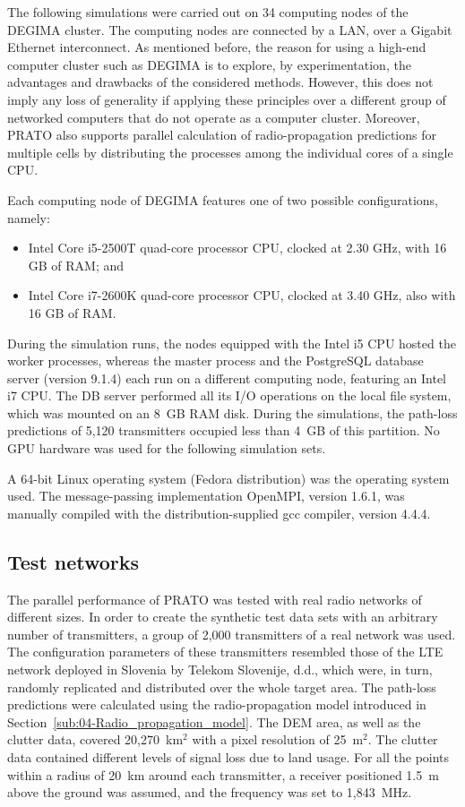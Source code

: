 The following simulations were carried out on 34 computing nodes of
the DEGIMA cluster. The computing nodes are connected by a LAN, over
a Gigabit Ethernet interconnect. As mentioned before, the reason for
using a high-end computer cluster such as DEGIMA is to explore, by
experimentation, the advantages and drawbacks of the considered methods.
However, this does not imply any loss of generality if applying these
principles over a different group of networked computers that do not
operate as a computer cluster. Moreover, PRATO also supports parallel
calculation of radio-propagation predictions for multiple cells by
distributing the processes among the individual cores of a single
CPU.

Each computing node of DEGIMA features one of two possible configurations,
namely:
\begin{itemize}
\item Intel Core i5-2500T quad-core processor CPU, clocked at 2.30 GHz,
with 16 GB of RAM; and
\item Intel Core i7-2600K quad-core processor CPU, clocked at 3.40 GHz,
also with 16 GB of RAM.
\end{itemize}
During the simulation runs, the nodes equipped with the Intel i5 CPU
hosted the worker processes, whereas the master process and the PostgreSQL
database server (version 9.1.4) each run on a different computing
node, featuring an Intel i7 CPU. The DB server performed all its I/O
operations on the local file system, which was mounted on an 8~GB
RAM disk. During the simulations, the path-loss predictions of 5,120
transmitters occupied less than 4~GB of this partition. No GPU hardware
was used for the following simulation sets.

A 64-bit Linux operating system (Fedora distribution) was the operating
system used. The message-passing implementation OpenMPI, version 1.6.1,
was manually compiled with the distribution-supplied gcc compiler,
version 4.4.4.


\subsection{Test networks}

The parallel performance of PRATO was tested with real radio networks
of different sizes. In order to create the synthetic test data sets
with an arbitrary number of transmitters, a group of 2,000 transmitters
of a real network was used. The configuration parameters of these
transmitters resembled those of the LTE network deployed in Slovenia
by Telekom Slovenije, d.d., which were, in turn, randomly replicated
and distributed over the whole target area. The path-loss predictions
were calculated using the radio-propagation model introduced in Section~\ref{sub:04-Radio_propagation_model}.
The DEM area, as well as the clutter data, covered 20,270~km$^{2}$
with a pixel resolution of 25~m$^{2}$. The clutter data contained
different levels of signal loss due to land usage. For all the points
within a radius of 20~km around each transmitter, a receiver positioned
1.5~m above the ground was assumed, and the frequency was set to
1,843~MHz.


